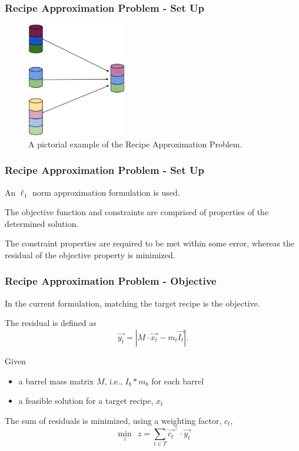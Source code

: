 \begin{frame}[ctb!]
  \frametitle{Recipe Approximation Problem - Set Up} 
  \begin{figure}
    \includegraphics[height=5cm]{./images/rap.eps}
    \caption{A pictorial example of the Recipe Approximation Problem.}
  \end{figure}
\end{frame}

\begin{frame}[ctb!]
  \frametitle{Recipe Approximation Problem - Set Up} 

  An $\ell_1$ norm approximation formulation is used.\vspace{0.2cm}
  
  The objective function and constraints are comprised of properties of the
  determined solution.\vspace{0.2cm}

  The constraint properties are required to be met within some error, whereas
  the residual of the objective property is minimized.
\end{frame}

\begin{frame}[ctb!]
  \frametitle{Recipe Approximation Problem - Objective}

  In the current formulation, matching the target recipe is the objective.
  
  The residual is defined as
  \begin{equation}\label{eqs:residual}
    \vec{y_{t}} = \left| M \cdot \vec{x_{t}}  - m_t \vec{I_{t}} \right|.
  \end{equation}

  Given
  \begin{itemize}
    \item a barrel mass matrix $M$, i.e., $I_b * m_b$ for each barrel
    \item a feasible solution for a target recipe, $x_t$
  \end{itemize}

  The sum of residuals is minimized, using a weighting factor, $c_t$,
  \begin{equation}\label{rap-obj}
    \min_{z} \:\: z = \sum_{t \in T} \vec{c_{t}}^{\top} \cdot \vec{y_{t}}
  \end{equation}
\end{frame}

